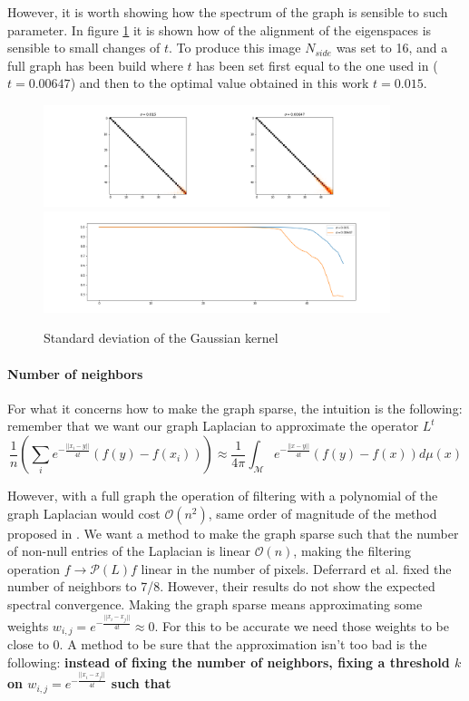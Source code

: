 However, it is worth showing how the spectrum of the graph is sensible to such parameter. In figure \ref{fig:t_sensitity} it is shown how of the alignment of the eigenspaces is sensible to small changes of $t$. To produce this image $N_{side}$ was set to 16, and a full graph has been build where $t$ has been set first equal to the one used in \cite{DeepSphere} ($t=0.00647$) and then to the optimal value obtained in this work $t=0.015$.

\begin{figure}[h]
	\label{fig:t_sensitity}
	\caption{Standard deviation of the Gaussian kernel}
	\centering
	\includegraphics[width=0.9\textwidth]{../codes/06_figures/t_sensitivity.png}
	\includegraphics[width=0.9\textwidth]{../codes/06_figures/t_sensitivity_diagonal.png}
\end{figure}


\paragraph{Number of neighbors}
For what it concerns how to make the graph sparse, the intuition is the following: remember that we want our graph Laplacian to approximate the operator $L^t$
$$\frac{1}{n}\left(\sum_i e^{-\frac{||x_i-y||}{4t}}(f(y)-f(x_i)) \right) \approx \frac{1}{ 4\pi}\int_\mathcal M e^{-\frac{||x-y||}{4t}}\left(f(y)-f(x)\right)d\mu(x) $$

However, with a full graph the operation of filtering with a polynomial of the graph Laplacian would cost $\mathcal O (n^2)$, same order of magnitude of the method proposed in \cite{bibid}. We want a method to make the graph sparse such that the number of non-null entries of the Laplacian is linear $\mathcal O (n)$, making the filtering operation $f\rightarrow \mathcal P(L)f$ linear in the number of pixels. Deferrard et al. \cite{bibid} fixed the number of neighbors to 7/8. However, their results do not show the expected spectral convergence.
Making the graph sparse means approximating some weights $w_{i,j}=e^{-\frac{||x_i-x_j||}{4t}} \approx 0$. For this to be accurate we need those weights to be close to 0. A method to be sure that the approximation isn't too bad is the following: \textbf{instead of fixing the number of neighbors, fixing a threshold $k$ on $w_{i,j}=e^{-\frac{||x_i-x_j||}{4t}}$ such that} 
	
